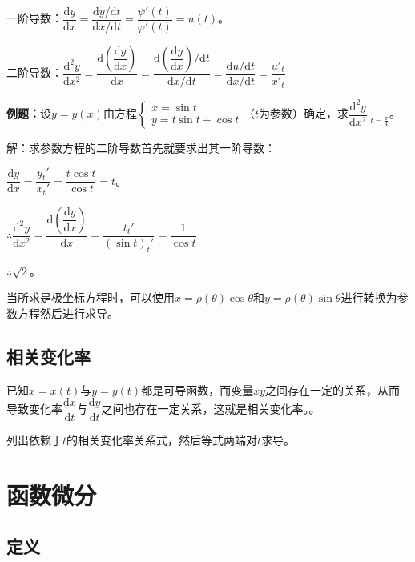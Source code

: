 \documentclass[UTF8, 12pt]{ctexart}
\begin{document}
        \medskip

        一阶导数：$\dfrac{\textrm{d}y}{\textrm{d}x}=\dfrac{\textrm{d}y/\textrm{d}t}{\textrm{d}x/\textrm{d}t}=\dfrac{\psi'(t)}{\varphi'(t)}=u(t)$。

        二阶导数：$\dfrac{\textrm{d}^2y}{\textrm{d}x^2}=\dfrac{\textrm{d}\left(\dfrac{\textrm{d}y}{\textrm{d}x}\right)}{\textrm{d}x}=\dfrac{\textrm{d}\left(\dfrac{\textrm{d}y}{\textrm{d}x}\right)/\textrm{d}t}{\textrm{d}x/\textrm{d}t}=\dfrac{\textrm{d}u/\textrm{d}t}{\textrm{d}x/\textrm{d}t}=\dfrac{u'_t}{x'_t}$

        \textbf{例题：}设$y=y(x)$由方程$\left\{
        \begin{array}{l}
            x=\sin t \\
            y=t\sin t+\cos t
        \end{array}
        \right.
        $（$t$为参数）确定，求$\dfrac{\textrm{d}^2y}{\textrm{d}x^2}\vert_{t=\frac{\pi}{4}}$。

        解：求参数方程的二阶导数首先就要求出其一阶导数：\medskip

        $\dfrac{\textrm{d}y}{\textrm{d}x}=\dfrac{y_t'}{x_t'}=\dfrac{t\cos t}{\cos t}=t$。\medskip

        $\therefore\dfrac{\textrm{d}^2y}{\textrm{d}x^2}=\dfrac{\textrm{d}\left(\dfrac{\textrm{d}y}{\textrm{d}x}\right)}{\textrm{d}x}=\dfrac{t_t'}{(\sin t)_t'}=\dfrac{1}{\cos t}$\medskip

        $\therefore \sqrt{2}$。

        当所求是极坐标方程时，可以使用$x=\rho(\theta)\cos\theta$和$y=\rho(\theta)\sin\theta$进行转换为参数方程然后进行求导。

        \subsection{相关变化率}

        已知$x=x(t)$与$y=y(t)$都是可导函数，而变量$xy$之间存在一定的关系，从而导致变化率$\dfrac{\textrm{d}x}{\textrm{d}t}$与$\dfrac{\textrm{d}y}{\textrm{d}t}$之间也存在一定关系，这就是相关变化率。。

        列出依赖于$t$的相关变化率关系式，然后等式两端对$t$求导。

        \section{函数微分}

        \subsection{定义}
\end{document}
